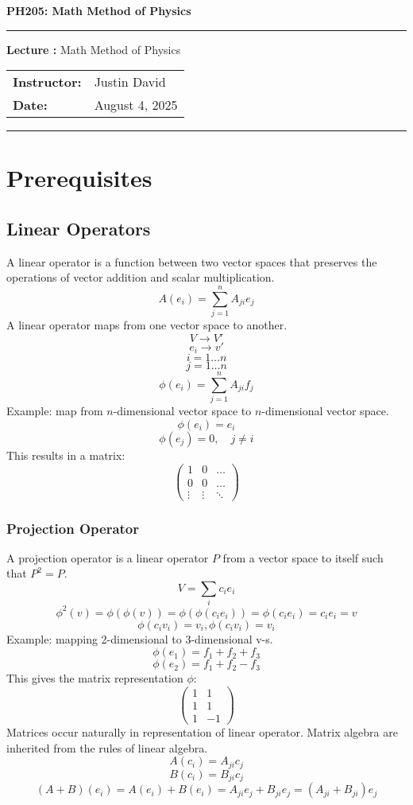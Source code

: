 \documentclass[11pt, a4paper]{report}
\newcommand{\courseTitle}{Default Course Title}
\newcommand{\lectureNumber}{XX}
\newcommand{\lectureTopic}{Default Lecture Topic}
\newcommand{\lectureDate}{\today}
\newcommand{\instructorName}{Professor Name}
\renewcommand{\maketitle}{
    \begin{center}
        \vspace*{\fill}
        {\Huge\bfseries \courseTitle}
        \vspace{0.5cm}
        
        \hrule
        \vspace{0.5cm}
        
        {\Large \textbf{Lecture \lectureNumber:} \lectureTopic}
        \vspace{0.5cm}
        
        \begin{tabular}{ll}
            \bfseries Instructor: & \instructorName \\
            \bfseries Date: & \lectureDate \\
        \end{tabular}
        
        \vspace{0.5cm}
        \hrule
        \vspace*{\fill}
    \end{center}
}
\renewcommand{\courseTitle}{PH205: Math Method of Physics}
\renewcommand{\lectureNumber}{}
\renewcommand{\lectureTopic}{Math Method of Physics}
\renewcommand{\lectureDate}{August 4, 2025}
\renewcommand{\instructorName}{Justin David}
\begin{document}
\maketitle %

\tableofcontents %
\newpage

\chapter{Prerequisites}

\section{Linear Operators}
A linear operator is a function between two vector spaces that preserves the operations of vector addition and scalar multiplication.
$$
A(e_i) = \sum_{j=1}^n A_{ji} e_j
$$
A linear operator maps from one vector space to another.
$$
V \to V'
$$
$$
e_i \to v'
$$
$$
i = 1 \dots n
$$
$$
j = 1 \dots n
$$
$$
\phi(e_i) = \sum_{j=1}^n A_{ji} f_j
$$
Example: map from $n$-dimensional vector space to $n$-dimensional vector space.
$$
\phi(e_i) = e_i
$$
$$
\phi(e_j) = 0, \quad j \ne i
$$
This results in a matrix:
$$
\begin{pmatrix}
1 & 0 & \dots \\
0 & 0 & \dots \\
\vdots & \vdots & \ddots
\end{pmatrix}
$$

\subsection{Projection Operator}
A projection operator is a linear operator $P$ from a vector space to itself such that $P^2 = P$.
$$
V = \sum_{i} c_i e_i
$$
$$
\phi^2(v) = \phi(\phi(v)) = \phi(\phi(c_i e_i)) = \phi(c_i e_i) = c_i e_i = v
$$
$$
\phi(c_i v_i) = v_i, \phi(c_i v_i) = v_i
$$
Example: mapping 2-dimensional to 3-dimensional v-s.
$$
\phi(e_1) = f_1+f_2+f_3
$$
$$
\phi(e_2) = f_1+f_2-f_3
$$
This gives the matrix representation $\phi$:
$$
\begin{pmatrix}
1 & 1 \\
1 & 1 \\
1 & -1
\end{pmatrix}
$$
Matrices occur naturally in representation of linear operator. Matrix algebra are inherited from the rules of linear algebra.
$$
A(c_i) =  A_{ji} c_j
$$
$$
B(c_i) = B_{ji} c_j
$$
$$
(A+B)(e_i) = A(e_i)+B(e_i) = A_{ji}e_j + B_{ji}e_j = (A_{ji}+B_{ji})e_j
$$
\end{document}
